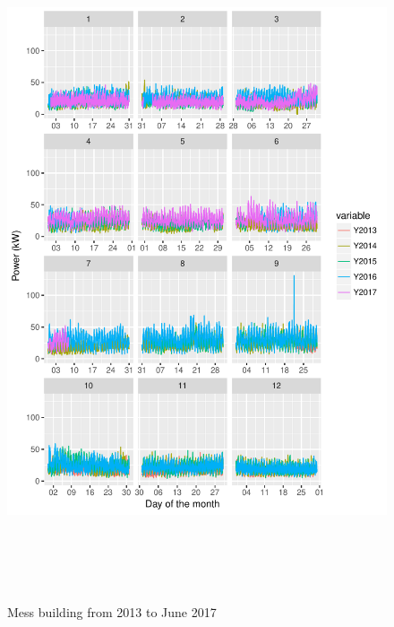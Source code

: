 \documentclass[11pt, oneside]{article}   	%
\begin{document}
\begin{figure}
\includegraphics[width=30cm,height=20cm,keepaspectratio]{mess_build.pdf}
\caption{Mess building from  2013 to June 2017}
\end{figure}
\end{document}
